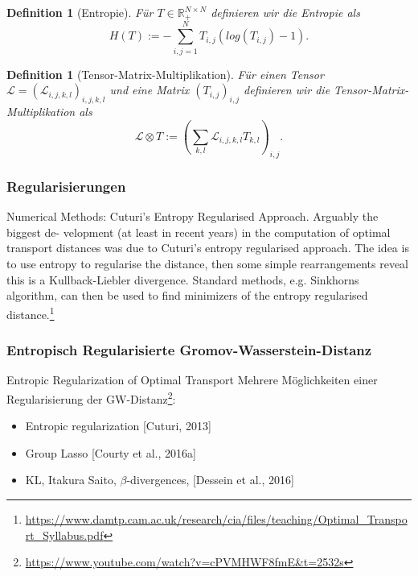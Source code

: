\documentclass[twoside, 11pt,a4paper]{article}
\newtheorem{definition}[theorem]{Definition}
\numberwithin{equation}{section}
\begin{document}
	\begin{definition}[Entropie]
		Für $T \in \mathbb{R}_{+}^{N \times N}$ definieren wir die Entropie als
		\begin{equation}
		H(T) := - \sum_{i,j=1}^N{T_{i,j}(log(T_{i,j})-1)}.
		\end{equation}
	\end{definition}
	
	
	
	
	\begin{definition}[Tensor-Matrix-Multiplikation]
		Für einen Tensor $\mathcal{L} = (\mathcal{L}_{i,j,k,l})_{i,j,k,l}$ und eine Matrix $(T_{i,j})_{i,j}$ definieren wir die Tensor-Matrix-Multiplikation als
		\begin{equation}
		\mathcal{L} \otimes T := (\sum_{k,l}{\mathcal{L}_{i,j,k,l}T_{k,l}})_{i,j}. \label{eq:tensor_matrix_mul}
		\end{equation}
	\end{definition}
	
	\subsubsection{Regularisierungen}
	
	
	Numerical Methods: Cuturi’s Entropy Regularised Approach. Arguably the biggest de-
	velopment (at least in recent years) in the computation of optimal transport distances was
	due to Cuturi’s entropy regularised approach. The idea is to use entropy to regularise the
	distance, then some simple rearrangements reveal this is a Kullback-Liebler divergence.
	Standard methods, e.g. Sinkhorns algorithm, can then be used to find minimizers of the
	entropy regularised distance.\footnote{\url{https://www.damtp.cam.ac.uk/research/cia/files/teaching/Optimal_Transport_Syllabus.pdf}}
	
	\subsubsection{Entropisch Regularisierte Gromov-Wasserstein-Distanz}
	Entropic Regularization of Optimal Transport \cite{computationalOT}
	Mehrere Möglichkeiten einer Regularisierung der GW-Distanz\footnote{\url{https://www.youtube.com/watch?v=cPVMHWF8fmE&t=2532s}}:
	\begin{itemize}
		\item Entropic regularization [Cuturi, 2013]\\
		\item Group Lasso [Courty et al., 2016a]\\
		\item KL, Itakura Saito, $\beta$-divergences,
		[Dessein et al., 2016]
	\end{itemize} 
	
\end{document}
